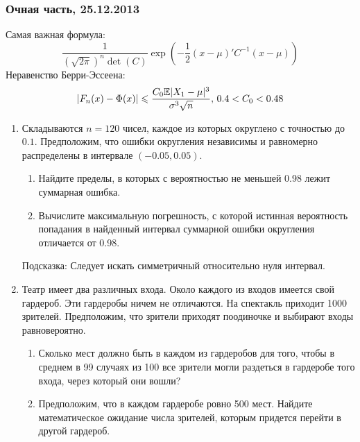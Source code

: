 \documentclass[12pt, a4paper]{article}\usepackage[]{graphicx}\usepackage[]{color}
\begin{document}
\subsubsection*{Очная часть, 25.12.2013}
Самая важная формула:
\[
\frac{1}{\left(\sqrt{2\pi}\right)^n\det(C)}\exp\left(-\frac{1}{2}(x-\mu)'C^{-1}(x-\mu)\right)
\]
Неравенство Берри-Эссеена:
\[
|F_n(x)-\Phi(x)| \leqslant \frac{C_0 \mathbb{E}|X_1-\mu|^3}{\sigma^3 \sqrt{n}}, \, 0.4<C_0<0.48
\]
\begin{enumerate}


\item Складываются $n=120$  чисел, каждое из которых округлено с точностью до $0.1$. Предположим, что ошибки округления независимы и равномерно распределены в интервале $(-0.05, 0.05 )$.
\begin{enumerate}
\item Найдите  пределы, в которых с вероятностью не меньшей 0.98  лежит суммарная ошибка.
\item  Вычислите максимальную погрешность, с которой истинная вероятность  попадания в найденный интервал суммарной ошибки округления отличается от 0.98.
\end{enumerate}
Подсказка: Следует искать симметричный относительно нуля интервал.

\item  Театр имеет два различных входа. Около каждого из входов имеется свой гардероб. Эти гардеробы ничем не отличаются. На спектакль приходит 1000 зрителей. Предположим, что зрители приходят поодиночке и выбирают входы равновероятно.
\begin{enumerate}
\item Сколько мест должно быть в каждом из гардеробов для того, чтобы в среднем в 99 случаях из 100 все зрители могли раздеться в гардеробе того входа, через который они вошли?
\item Предположим, что в каждом гардеробе ровно 500 мест. Найдите математическое ожидание числа зрителей, которым придется перейти в другой гардероб.
\end{enumerate}


\end{enumerate}
\end{document}
